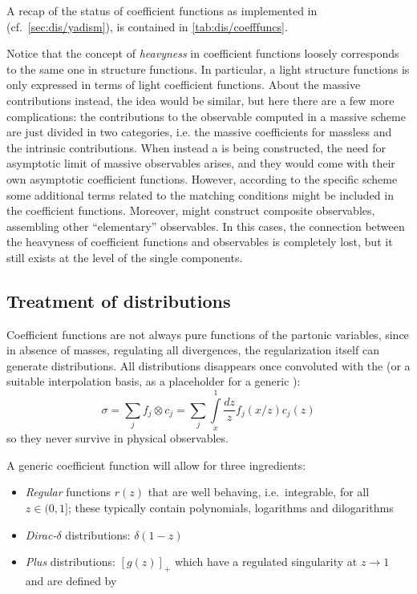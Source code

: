 A recap of the status of coefficient functions as implemented in \yadism (cf.\
\cref{sec:dis/yadism}), is contained in \cref{tab:dis/coefffuncs}.




Notice that the concept of \textit{heavyness} in coefficient functions loosely
corresponds to the same one in structure functions.
In particular, a light structure functions is only expressed in terms of light
coefficient functions.
%
About the massive contributions instead, the idea would be similar, but here
there are a few more complications: the contributions to the observable
computed in a massive scheme are just divided in two categories, i.e. the
massive coefficients for massless \pdfs and the intrinsic contributions.
%
When instead a \gmvfns is being constructed, the need for asymptotic limit of
massive observables arises, and they would come with their own asymptotic
coefficient functions.
However, according to the specific scheme some additional terms related to the
matching conditions might be included in the coefficient functions.
Moreover, \gmvfns might construct composite observables, assembling other
\enquote{elementary} observables. In this cases, the connection between the
heavyness of coefficient functions and observables is completely lost, but it
still exists at the level of the single components.

\subsection{Treatment of distributions}
\label{sec:dis/distr}

Coefficient functions are not always pure functions of the partonic variables,
since in absence of masses, regulating all divergences, the regularization
itself can generate distributions.
%
All distributions disappears once convoluted with the \pdf (or a suitable
interpolation basis, as a placeholder for a generic \pdf):
\begin{equation}
    \sigma = \sum_j f_j \otimes c_j = \sum_j \int\limits_x^1 \frac {dz}{z} f_j(x/z) c_j(z)
\end{equation}
so they never survive in physical observables.

A generic coefficient function will allow for three ingredients:
\begin{itemize}
  \item \textit{Regular} functions $r(z)$ that are well behaving, i.e.\ integrable,
    for all $z \in (0,1]$; these typically contain polynomials, logarithms
    and dilogarithms
  \item \textit{Dirac-$\delta$} distributions: $\delta(1-z)$
  \item \textit{Plus} distributions: $\left[g(z)\right]_+$ which have a
    regulated singularity at $z\to 1$ and are defined by
\end{itemize}

